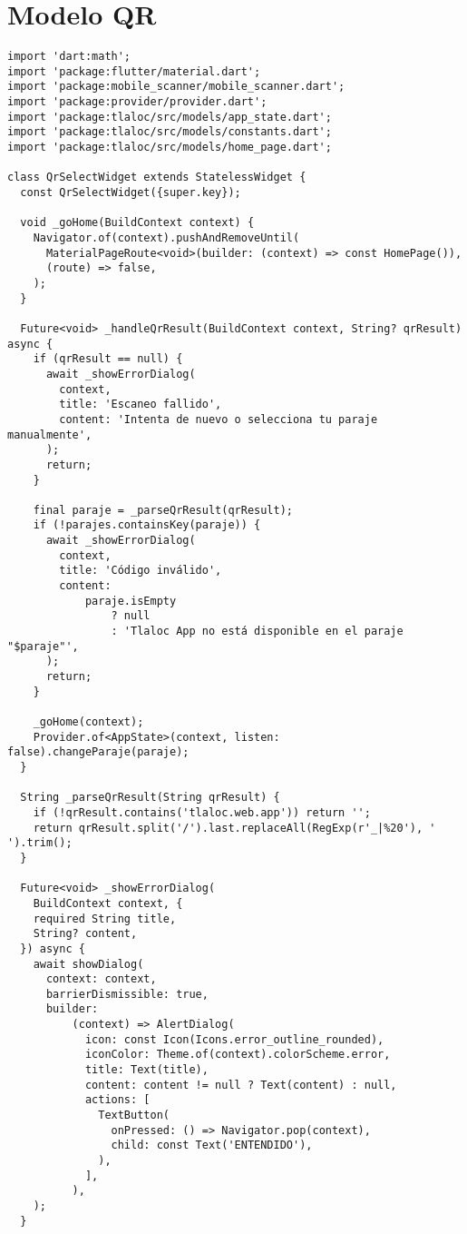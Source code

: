 






\section{Modelo QR}
\label{anexo:alg11}
\begin{verbatim}
import 'dart:math';
import 'package:flutter/material.dart';
import 'package:mobile_scanner/mobile_scanner.dart';
import 'package:provider/provider.dart';
import 'package:tlaloc/src/models/app_state.dart';
import 'package:tlaloc/src/models/constants.dart';
import 'package:tlaloc/src/models/home_page.dart';

class QrSelectWidget extends StatelessWidget {
  const QrSelectWidget({super.key});

  void _goHome(BuildContext context) {
    Navigator.of(context).pushAndRemoveUntil(
      MaterialPageRoute<void>(builder: (context) => const HomePage()),
      (route) => false,
    );
  }

  Future<void> _handleQrResult(BuildContext context, String? qrResult) async {
    if (qrResult == null) {
      await _showErrorDialog(
        context,
        title: 'Escaneo fallido',
        content: 'Intenta de nuevo o selecciona tu paraje manualmente',
      );
      return;
    }

    final paraje = _parseQrResult(qrResult);
    if (!parajes.containsKey(paraje)) {
      await _showErrorDialog(
        context,
        title: 'Código inválido',
        content:
            paraje.isEmpty
                ? null
                : 'Tlaloc App no está disponible en el paraje "$paraje"',
      );
      return;
    }

    _goHome(context);
    Provider.of<AppState>(context, listen: false).changeParaje(paraje);
  }

  String _parseQrResult(String qrResult) {
    if (!qrResult.contains('tlaloc.web.app')) return '';
    return qrResult.split('/').last.replaceAll(RegExp(r'_|%20'), ' ').trim();
  }

  Future<void> _showErrorDialog(
    BuildContext context, {
    required String title,
    String? content,
  }) async {
    await showDialog(
      context: context,
      barrierDismissible: true,
      builder:
          (context) => AlertDialog(
            icon: const Icon(Icons.error_outline_rounded),
            iconColor: Theme.of(context).colorScheme.error,
            title: Text(title),
            content: content != null ? Text(content) : null,
            actions: [
              TextButton(
                onPressed: () => Navigator.pop(context),
                child: const Text('ENTENDIDO'),
              ),
            ],
          ),
    );
  }


\end{verbatim}
